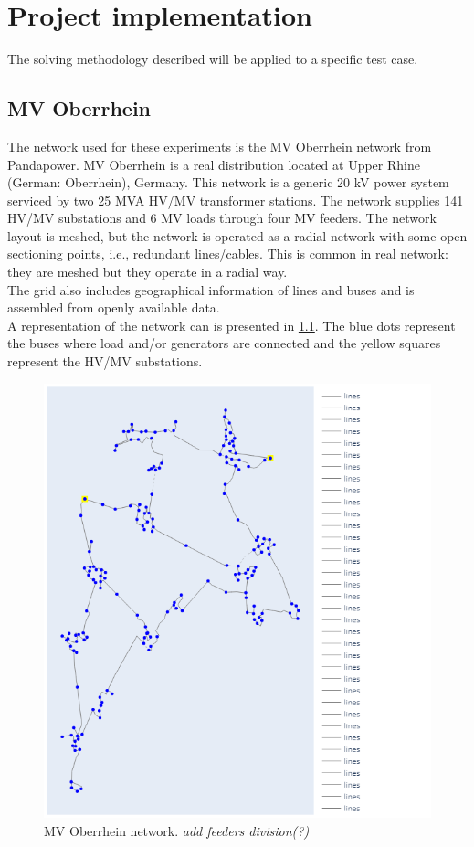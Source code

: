 \chapter{Project implementation}
\label{chapter5}
The solving methodology described will be applied to a specific test case.


\section{MV Oberrhein}
\label{sec:MVober}
The network used for these experiments is the MV Oberrhein network from Pandapower. MV Oberrhein is a real distribution located at Upper Rhine  (German:  Oberrhein),  Germany. This network is a generic 20 kV power system serviced by two 25 MVA HV/MV transformer stations. The network supplies 141 HV/MV substations and 6 MV loads through four MV feeders. The network layout is meshed, but the network is operated as a radial network with some open sectioning points, i.e., redundant lines/cables. This is common in real network: they are meshed but they operate in a radial way.\\
The grid also includes geographical information of lines and buses and is assembled from openly available data.  \\

A representation of the network can is presented in \ref{fig:MVober}. The blue dots represent the buses where load and/or generators are connected and the yellow squares represent the HV/MV substations.
\begin{figure}[H]
\centering
    \includegraphics[width=.33\linewidth]{images/MVOberr/Full.png}
\caption{MV Oberrhein network. \emph{add feeders division(?)}}
\label{fig:MVober}
\end{figure}


